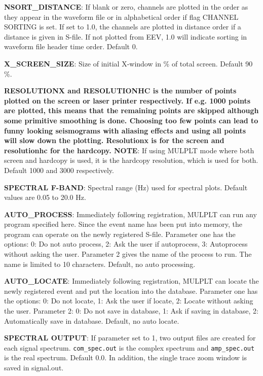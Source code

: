 \textbf{NSORT\_DISTANCE}: If blank or zero, channels are plotted in 
the order as they appear in the waveform file 
or in alphabetical order if flag CHANNEL SORTING is set. 
If set to 1.0, the channels are plotted in 
distance order if a distance is given in S-file. 
If not plotted from EEV, 1.0 will indicate sorting in 
waveform file header time order. Default 0.

\textbf{X\_SCREEN\_SIZE}: Size of initial X-window in \% of total screen. Default 90 \%. 

\textbf{RESOLUTIONX and RESOLUTIONHC is the number of points plotted on the screen or laser printer respectively. If e.g. 1000 points are plotted, this means that the remaining points are skipped although some primitive smoothing is done. Choosing too few points can lead to funny looking seismograms with aliasing effects and using all points will slow down the plotting. Resolutionx is for the screen and resolutionhc for the hardcopy. NOTE}: If using MULPLT mode where both screen and hardcopy is used, it is the hardcopy resolution, which is used for both. Default 1000 and 3000 respectively. 

\textbf{SPECTRAL F-BAND}: Spectral range (Hz) used for spectral plots. Default values are 0.05 to 20.0 Hz. 

\textbf{AUTO\_PROCESS}: Immediately following registration, MULPLT can run any program specified here. Since the event name has been put into memory, the program can operate on the newly registered S-file. Parameter one has the options: 0: Do not auto process, 2: Ask the user if autoprocess, 3: Autoprocess without asking the user. Parameter 2 gives the name of the process to run. The name is limited to 10 characters. Default, no auto processing. 

\textbf{AUTO\_LOCATE}: Immediately following registration, MULPLT can locate the newly registered event and put the location into the database. Parameter one has the options: 0: Do not locate, 1: Ask the user if locate, 2: Locate without asking the user. Parameter 2: 0: Do not save in database, 1: Ask if saving in database, 2: Automatically save in database. Default, no auto locate. 

\textbf{SPECTRAL OUTPUT}: If parameter set to 1, two output files are created for each signal spectrum. \texttt{com\_spec.out} is the complex spectrum and \texttt{amp\_spec.out} is the real spectrum. Default 0.0. In addition, the single trace zoom window is saved in signal.out. 

